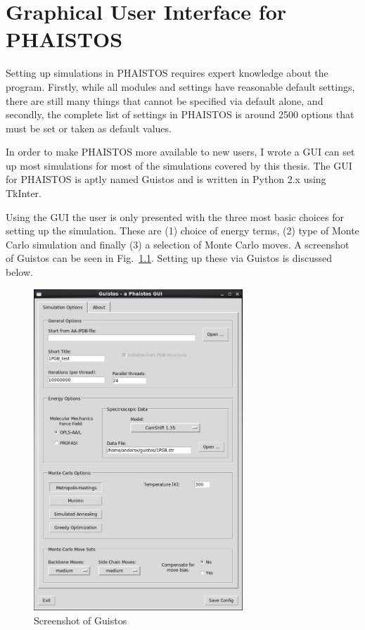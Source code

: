 \chapter{Graphical User Interface for PHAISTOS}

Setting up simulations in PHAISTOS requires expert knowledge about the program. 
Firstly, while all modules and settings have reasonable default settings, there are still many things that cannot be specified via default alone, and secondly, the complete list of settings in PHAISTOS is around 2500 options that must be set or taken as default values.

In order to make PHAISTOS more available to new users, I wrote a GUI can set up most simulations for most of the simulations covered by this thesis.
The GUI for PHAISTOS is aptly named Guistos and is written in Python 2.x using TkInter.

Using the GUI the user is only presented with the three most basic choices for setting up the simulation.
These are (1) choice of energy terms, (2) type of Monte Carlo simulation and finally (3) a selection of Monte Carlo moves.
A screenshot of Guistos can be seen in Fig.~\ref{fig:guistos}.
Setting up these via Guistos is discussed below.

\begin{figure}
    \centering
    \includegraphics[width=0.70\textwidth]{figures/guistos.pdf}
    \caption{Screenshot of Guistos}
    \label{fig:guistos}
\end{figure}

